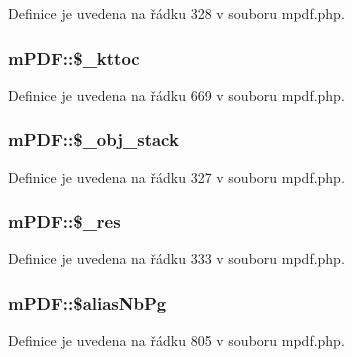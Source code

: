 Definice je uvedena na řádku 328 v souboru mpdf.\-php.

\hypertarget{classm_p_d_f_a4da9bbd16fd880722d8fb1475a9bcaea}{
\subsubsection[{\$\-\_\-kttoc}]{\setlength{\rightskip}{0pt plus 5cm}m\-P\-D\-F\-::\$\-\_\-kttoc}}\label{classm_p_d_f_a4da9bbd16fd880722d8fb1475a9bcaea}


Definice je uvedena na řádku 669 v souboru mpdf.\-php.

\hypertarget{classm_p_d_f_a3aa98dab40c65c74583f27f3acf57a3f}{
\subsubsection[{\$\-\_\-obj\-\_\-stack}]{\setlength{\rightskip}{0pt plus 5cm}m\-P\-D\-F\-::\$\-\_\-obj\-\_\-stack}}\label{classm_p_d_f_a3aa98dab40c65c74583f27f3acf57a3f}


Definice je uvedena na řádku 327 v souboru mpdf.\-php.

\hypertarget{classm_p_d_f_a2c56a9e45f9c2f2d9ba0185813a0e6d4}{
\subsubsection[{\$\-\_\-res}]{\setlength{\rightskip}{0pt plus 5cm}m\-P\-D\-F\-::\$\-\_\-res}}\label{classm_p_d_f_a2c56a9e45f9c2f2d9ba0185813a0e6d4}


Definice je uvedena na řádku 333 v souboru mpdf.\-php.

\hypertarget{classm_p_d_f_a4cb42bda8a3f4c96b899ad85ce2b849c}{
\subsubsection[{\$alias\-Nb\-Pg}]{\setlength{\rightskip}{0pt plus 5cm}m\-P\-D\-F\-::\$alias\-Nb\-Pg}}\label{classm_p_d_f_a4cb42bda8a3f4c96b899ad85ce2b849c}


Definice je uvedena na řádku 805 v souboru mpdf.\-php.



